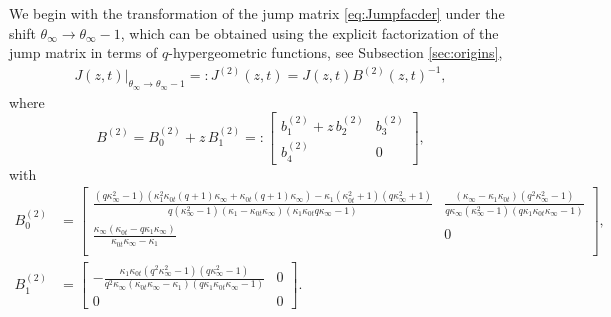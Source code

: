 \documentclass[a4paper,reqno,11pt]{amsart}
\numberwithin{equation}{section}
\numberwithin{figure}{section}
\theoremstyle{plain}
\newtheorem{theorem}{Theorem}[section]
\theoremstyle{remark}
\numberwithin{rhp}{section}
\begin{document}



We begin with the transformation of the jump matrix \eqref{eq:Jumpfacder} under the shift $\theta_{\infty} \to \theta_{\infty}-1$, which can be obtained using the explicit factorization of the jump matrix in terms of $q$-hypergeometric functions, see Subsection \ref{sec:origins},
\begin{align}\label{eq:Jshift}
  J(z, t)\vert_{\theta_{\infty} \to \theta_{\infty}-1}=:  {J}^{(2)}(z,t) = J(z, t) B^{(2)}(z,t)^{-1}, 
\end{align}
where
\begin{equation*}
    B^{(2)} = B_0^{(2)} + z\, B_{1}^{(2)}=:  \begin{bmatrix}

    b_1^{(2)} + z\, b_2^{(2)} & b_3^{(2)} \\
    b_4^{(2)} & 0
    
\end{bmatrix},
\end{equation*}
with 
\begin{align}
    B_0^{(2)} &= \begin{bmatrix}
 \frac{\left(q \kappa _{\infty }^2-1\right) \left(\kappa _1^2 \kappa_{0t}  (q+1) \kappa _{\infty }+\kappa_{0t}  (q+1) \kappa _{\infty }\right)-\kappa _1 \left(\kappa_{0t} ^2+1\right) \left(q \kappa _{\infty }^2+1\right)}{q \left(\kappa _{\infty }^2-1\right) \left(\kappa _1-\kappa_{0t}  \kappa _{\infty }\right) \left(\kappa _1 \kappa_{0t}  q \kappa _{\infty }-1\right)} & \frac{\left(\kappa _{\infty }-\kappa _1 \kappa_{0t} \right) \left(q^2 \kappa _{\infty }^2-1\right)}{q \kappa _{\infty } \left(\kappa _{\infty }^2-1\right) \left(q\kappa _1 \kappa_{0t}  \kappa _{\infty }-1\right)} \\
 \frac{\kappa _{\infty } \left(\kappa_{0t} -q\kappa _1 \kappa _{\infty }\right)}{\kappa_{0t}  \kappa _{\infty }-\kappa _1} & 0 \\
\end{bmatrix},\\
    B_1^{(2)} &= \begin{bmatrix}
       -\frac{\kappa _1 \kappa_{0t}  \left(q^2 \kappa _{\infty }^2-1\right) \left(q \kappa _{\infty }^2-1\right)}{q^2 \kappa _{\infty } \left(\kappa_{0t}  \kappa _{\infty }-\kappa _1\right) \left(q\kappa _1 \kappa_{0t}  \kappa _{\infty }-1\right)} & 0 \\
       0  & 0
    \end{bmatrix}.
\end{align}
\end{document}
